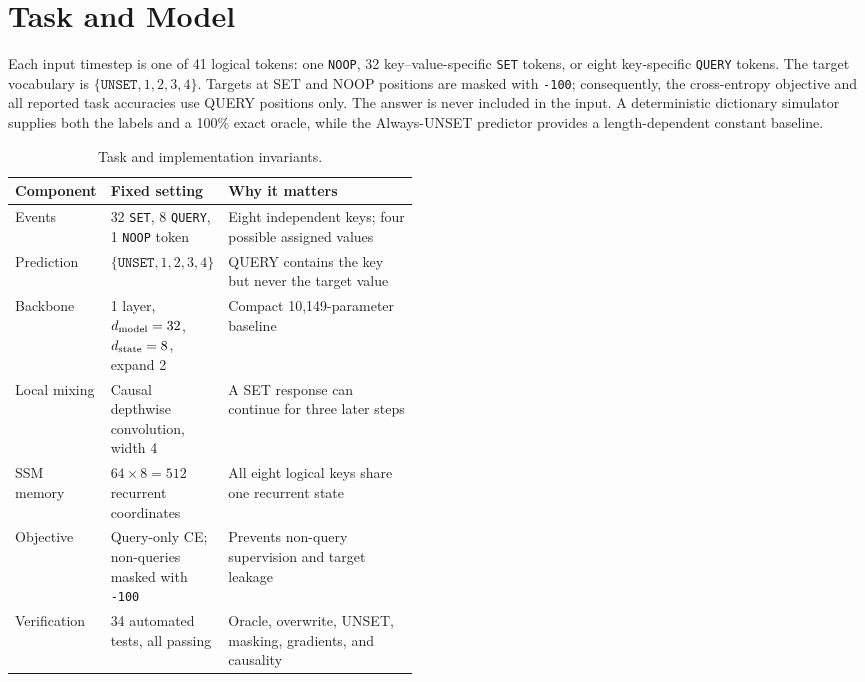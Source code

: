 \documentclass[10pt,a4paper]{article}
\newcommand{\SET}{\texttt{SET}}
\newcommand{\QUERY}{\texttt{QUERY}}
\newcommand{\NOOP}{\texttt{NOOP}}
\newcommand{\UNSET}{\texttt{UNSET}}
\begin{document}
\section{Task and Model}
Each input timestep is one of 41 logical tokens: one \NOOP, 32 key--value-specific \SET{} tokens, or eight key-specific \QUERY{} tokens. The target vocabulary is \(\{\UNSET,1,2,3,4\}\). Targets at SET and NOOP positions are masked with \texttt{-100}; consequently, the cross-entropy objective and all reported task accuracies use QUERY positions only. The answer is never included in the input. A deterministic dictionary simulator supplies both the labels and a 100\% exact oracle, while the Always-UNSET predictor provides a length-dependent constant baseline.
\begin{table}[!htbp]
\centering\small
\caption{Task and implementation invariants.}
\begin{tabularx}{\linewidth}{p{0.20\linewidth}p{0.27\linewidth}Y}
\toprule
Component & Fixed setting & Why it matters \\
\midrule
Events & 32 \SET, 8 \QUERY, 1 \NOOP{} token & Eight independent keys; four possible assigned values \\
Prediction & \(\{\UNSET,1,2,3,4\}\) & QUERY contains the key but never the target value \\
Backbone & 1 layer, \(d_{\rm model}=32\), \(d_{\rm state}=8\), expand 2 & Compact 10,149-parameter baseline \\
Local mixing & Causal depthwise convolution, width 4 & A SET response can continue for three later steps \\
SSM memory & \(64\times8=512\) recurrent coordinates & All eight logical keys share one recurrent state \\
Objective & Query-only CE; non-queries masked with \texttt{-100} & Prevents non-query supervision and target leakage \\
Verification & 34 automated tests, all passing & Oracle, overwrite, UNSET, masking, gradients, and causality \\
\bottomrule
\end{tabularx}
\end{table}
\end{document}
